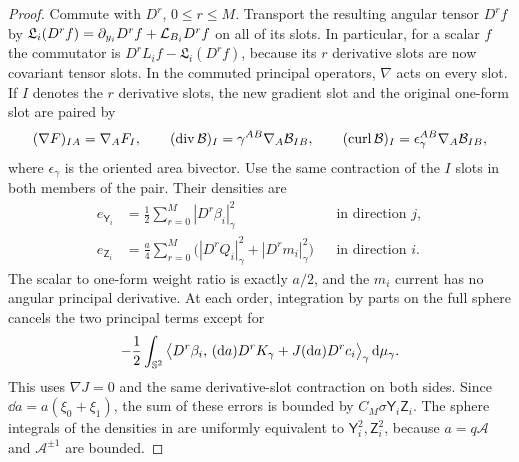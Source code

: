 \begin{proof}
Commute  with $D^r$, $0\le r\le M$.  Transport the
resulting angular tensor $D^r f$ by
$\mathfrak L_i(D^r f)=\partial_{y_i}D^r f+\mathcal L_{B_i}D^r f$ on all
of its slots.  In particular, for a scalar $f$ the commutator is
$D^rL_i f-\mathfrak L_i(D^r f)$, because its $r$ derivative slots
are now covariant tensor slots.  In the commuted principal operators,
$\nabla$ acts on every slot.  If $I$ denotes the $r$ derivative
slots, the new gradient slot and the original one-form slot are paired by
\[
 (\nabla F)_{IA}=\nabla_A F_I,\qquad
 (\operatorname{div}\mathcal B)_I=\gamma^{AB}\nabla_A\mathcal B_{IB},\qquad
 (\operatorname{curl}\mathcal B)_I=\epsilon_\gamma^{AB}\nabla_A\mathcal B_{IB},
\]
where $\epsilon_\gamma$ is the oriented area bivector.  Use the same
contraction of the $I$ slots in both members of the pair.  Their densities are
\begin{equation}\label{dn:high-pair-densities}
\begin{aligned}
 e_{\mathsf Y_i}
   &=\frac12\sum_{r=0}^M|D^r\beta_i|_\gamma^2
       &&\text{in direction }j,\\
 e_{\mathsf Z_i}
   &=\frac a4\sum_{r=0}^M
       \bigl(|D^rQ_i|_\gamma^2+|D^rm_i|_\gamma^2\bigr)
       &&\text{in direction }i .
\end{aligned}
\end{equation}
The scalar to one-form weight ratio is exactly $a/2$, and the
$m_i$ current has no angular principal derivative.  At each order,
integration by parts on the full sphere cancels the two principal
terms except for
\[
 -\frac12\int_{\mathbb S^2}
 \big\langle D^r\beta_i,\,
       (\mathrm d a)D^rK_\gamma+J(\mathrm d a)D^rc_i
 \big\rangle_\gamma\,\mathrm d\mu_\gamma .
\]
This uses $\nabla J=0$ and the same derivative-slot contraction on
both sides.  Since $\dd a=a(\xi_0+\xi_1)$, the sum of these errors is
bounded by $C_M\sigma\mathsf Y_i\mathsf Z_i$.  The sphere integrals of
the densities in
 are uniformly equivalent to
$\mathsf Y_i^2,\mathsf Z_i^2$, because $a=q\mathcal A$ and
$\mathcal A^{\pm1}$ are bounded.


\end{proof}
